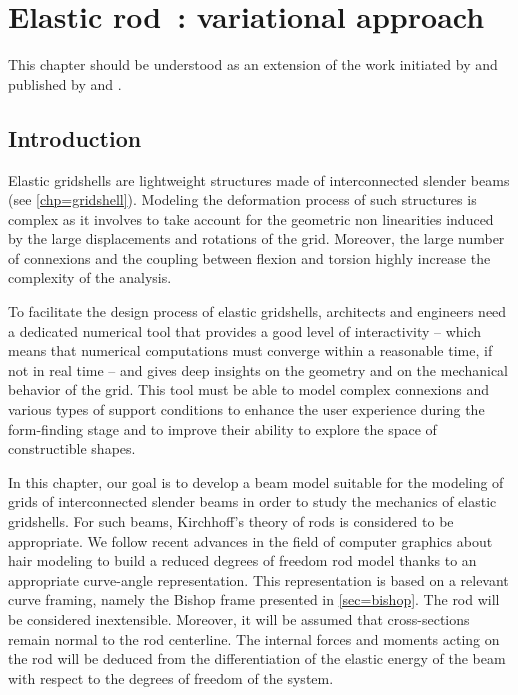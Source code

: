 
\newrefsegment
{}
\chapter{Elastic rod~: variational approach}\label{chp=energy}

This chapter should be understood as an extension of the work initiated by  and published by  and .

\section{Introduction}

Elastic gridshells are lightweight structures made of interconnected slender beams (see \cref{chp=gridshell}). Modeling the deformation process of such structures is complex as it involves to take account for the geometric non linearities induced by the large displacements and rotations of the grid. Moreover, the large number of connexions and the coupling between flexion and torsion highly increase the complexity of the analysis.

To facilitate the design process of elastic gridshells, architects and engineers need a dedicated numerical tool that provides a good level of interactivity -- which means that numerical computations must converge within a reasonable time, if not in real time -- and gives deep insights on the geometry and on the mechanical behavior of the grid. This tool must be able to model complex connexions and various types of support conditions to enhance the user experience during the form-finding stage and to improve their ability to explore the space of constructible shapes.

In this chapter, our goal is to develop a beam model suitable for the modeling of grids of interconnected slender beams in order to study the mechanics of elastic gridshells. For such beams, Kirchhoff's theory of rods is considered to be appropriate. We follow recent advances in the field of computer graphics about hair modeling \cite{Bergou2008} to build a reduced degrees of freedom rod model thanks to an appropriate curve-angle representation. This representation is based on a relevant curve framing, namely the Bishop frame presented in \cref{sec=bishop}. The rod will be considered inextensible. Moreover, it will be assumed that cross-sections remain normal to the rod centerline. The internal forces and moments acting on the rod will be deduced from the differentiation of the elastic energy of the beam with respect to the degrees of freedom of the system.

